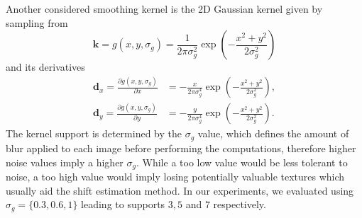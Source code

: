 Another considered smoothing kernel is the 2D Gaussian kernel given by sampling from
\begin{equation}
\mathbf{k} = g(x, y, \sigma_g) = \frac{1}{2 \pi \sigma_g^2}\exp\left(-\frac{x^2 + y^2}{2\sigma_g^2} \right)
\end{equation}
and its derivatives
\begin{align}
\mathbf{d}_x = \frac{\partial g(x,y, \sigma_g)}{\partial x} &= -\frac{x}{2\pi\sigma_g^4}\exp\left(-\frac{x^2 + y^2}{2\sigma_g^2} \right),\\
\mathbf{d}_y = \frac{\partial g(x,y, \sigma_g)}{\partial y} &= -\frac{y}{2\pi\sigma_g^4}\exp\left(-\frac{x^2 + y^2}{2\sigma_g^2} \right).
\end{align}
\noindent The kernel support is determined by the $\sigma_g$ value, which defines the amount of blur applied to each image before performing the computations, therefore higher noise values imply a higher $\sigma_g$. While a too low value would be less tolerant to noise, a too high value would imply losing potentially valuable textures which usually aid the shift estimation method. In our experiments, we evaluated using $\sigma_g=\{0.3, 0.6, 1\}$ leading to supports $3, 5$ and $7$ respectively. 

